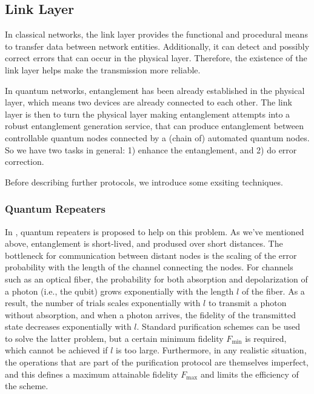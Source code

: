 \documentclass[10pt]{article}
\begin{document}
\subsection{Link Layer}

In classical networks, the link layer provides the functional and procedural means to transfer data between network entities. Additionally, it can detect and possibly correct errors that can occur in the physical layer. Therefore, the existence of the link layer helps make the transmission more reliable.


In quantum networks, entanglement has been already established in the physical layer, which means two devices are already connected to each other. The link layer is then to turn the physical layer making entanglement attempts into a robust entanglement generation service, that can produce entanglement between controllable quantum nodes connected by a (chain of) automated quantum nodes. So we have two tasks in general: 1) enhance the entanglement, and 2) do error correction.

Before describing further protocols, we introduce some exsiting techniques.

\subsubsection{Quantum Repeaters}

In \cite{briegel1998quantum}, quantum repeaters is proposed to help on this problem. As we've mentioned above, entanglement is short-lived, and prodused over short distances. The bottleneck for communication between distant nodes is the scaling of the error probability with the length of the channel connecting the nodes.  For channels such as an optical fiber, the probability for both absorption and depolarization of a photon (i.e., the qubit) grows exponentially with the length $l$ of the fiber. As a result, the number of trials scales exponentially with $l$ to transmit a photon without absorption, and when a photon arrives, the fidelity of the transmitted state decreases exponentially with $l$. Standard purification schemes\cite{bennett1996purification} can be used to solve the latter problem, but a certain minimum fidelity $F_{\min}$ is required, which cannot be achieved if $l$ is too large. Furthermore, in any realistic situation, the operations that are part of the purification protocol are themselves imperfect, and this defines a maximum attainable fidelity $F_{\max}$ and limits the efficiency of the scheme. 
\end{document}

